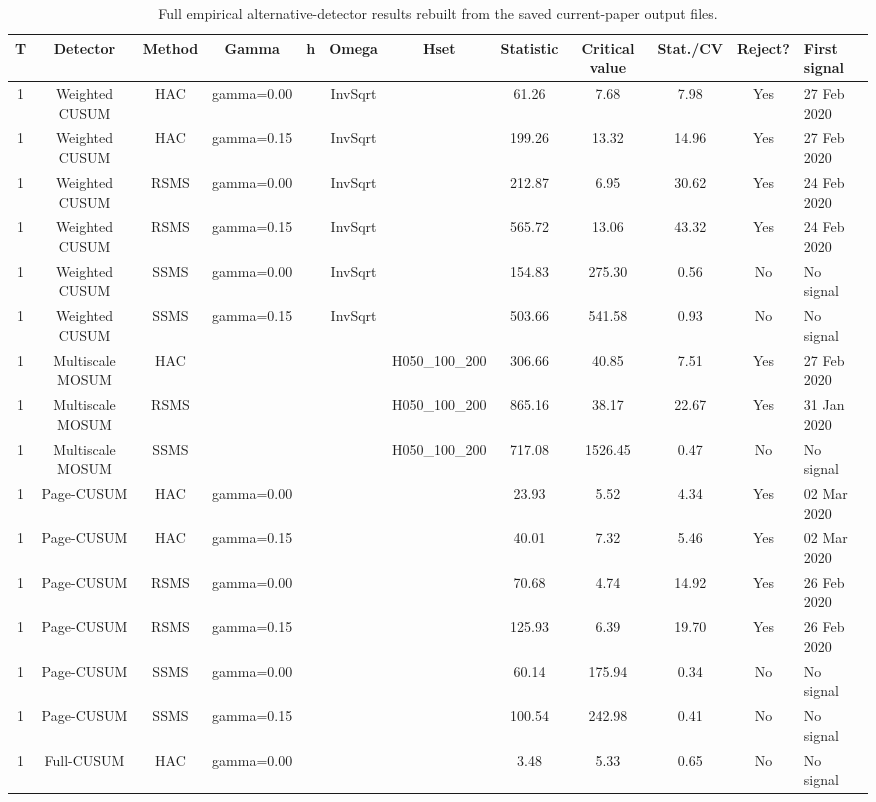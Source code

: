 \begin{table}[htbp]
\centering
\scriptsize
\caption{Full empirical alternative-detector results rebuilt from the saved current-paper output files.}
\label{tab:bundle-empirical-alt-full}
\begin{tabular}{cccccccccccl}
\toprule
T & Detector & Method & Gamma & h & Omega & Hset & Statistic & Critical value & Stat./CV & Reject? & First signal \\
\midrule
1 & Weighted CUSUM & HAC & gamma=0.00 &  & InvSqrt &  & 61.26 & 7.68 & 7.98 & Yes & 27 Feb 2020 \\
1 & Weighted CUSUM & HAC & gamma=0.15 &  & InvSqrt &  & 199.26 & 13.32 & 14.96 & Yes & 27 Feb 2020 \\
1 & Weighted CUSUM & RSMS & gamma=0.00 &  & InvSqrt &  & 212.87 & 6.95 & 30.62 & Yes & 24 Feb 2020 \\
1 & Weighted CUSUM & RSMS & gamma=0.15 &  & InvSqrt &  & 565.72 & 13.06 & 43.32 & Yes & 24 Feb 2020 \\
1 & Weighted CUSUM & SSMS & gamma=0.00 &  & InvSqrt &  & 154.83 & 275.30 & 0.56 & No & No signal \\
1 & Weighted CUSUM & SSMS & gamma=0.15 &  & InvSqrt &  & 503.66 & 541.58 & 0.93 & No & No signal \\
1 & Multiscale MOSUM & HAC &  &  &  & H050_100_200 & 306.66 & 40.85 & 7.51 & Yes & 27 Feb 2020 \\
1 & Multiscale MOSUM & RSMS &  &  &  & H050_100_200 & 865.16 & 38.17 & 22.67 & Yes & 31 Jan 2020 \\
1 & Multiscale MOSUM & SSMS &  &  &  & H050_100_200 & 717.08 & 1526.45 & 0.47 & No & No signal \\
1 & Page-CUSUM & HAC & gamma=0.00 &  &  &  & 23.93 & 5.52 & 4.34 & Yes & 02 Mar 2020 \\
1 & Page-CUSUM & HAC & gamma=0.15 &  &  &  & 40.01 & 7.32 & 5.46 & Yes & 02 Mar 2020 \\
1 & Page-CUSUM & RSMS & gamma=0.00 &  &  &  & 70.68 & 4.74 & 14.92 & Yes & 26 Feb 2020 \\
1 & Page-CUSUM & RSMS & gamma=0.15 &  &  &  & 125.93 & 6.39 & 19.70 & Yes & 26 Feb 2020 \\
1 & Page-CUSUM & SSMS & gamma=0.00 &  &  &  & 60.14 & 175.94 & 0.34 & No & No signal \\
1 & Page-CUSUM & SSMS & gamma=0.15 &  &  &  & 100.54 & 242.98 & 0.41 & No & No signal \\
1 & Full-CUSUM & HAC & gamma=0.00 &  &  &  & 3.48 & 5.33 & 0.65 & No & No signal \\

\end{tabular}
\end{table}
